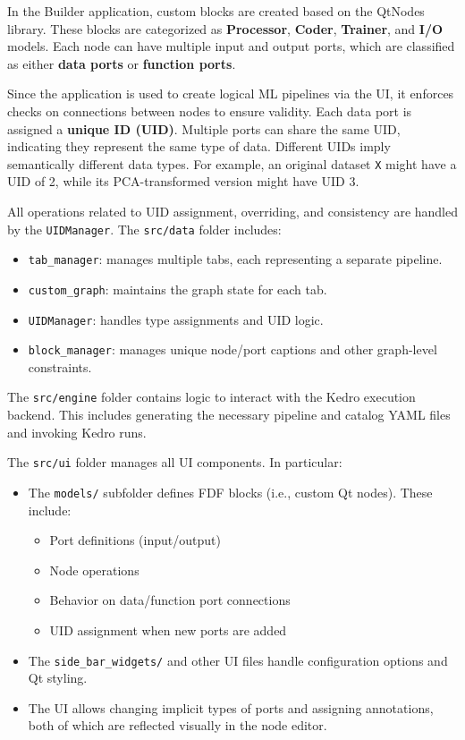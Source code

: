 In the Builder application, custom blocks are created based on the QtNodes library. These blocks are categorized as \textbf{Processor}, \textbf{Coder}, \textbf{Trainer}, and \textbf{I/O} models. Each node can have multiple input and output ports, which are classified as either \textbf{data ports} or \textbf{function ports}.

Since the application is used to create logical ML pipelines via the UI, it enforces checks on connections between nodes to ensure validity. Each data port is assigned a \textbf{unique ID (UID)}. Multiple ports can share the same UID, indicating they represent the same type of data. Different UIDs imply semantically different data types. For example, an original dataset \texttt{X} might have a UID of 2, while its PCA-transformed version might have UID 3.

All operations related to UID assignment, overriding, and consistency are handled by the \texttt{UIDManager}. The \texttt{src/data} folder includes:
\begin{itemize}
    \item \texttt{tab\_manager}: manages multiple tabs, each representing a separate pipeline.
    \item \texttt{custom\_graph}: maintains the graph state for each tab.
    \item \texttt{UIDManager}: handles type assignments and UID logic.
    \item \texttt{block\_manager}: manages unique node/port captions and other graph-level constraints.
\end{itemize}

The \texttt{src/engine} folder contains logic to interact with the Kedro execution backend. This includes generating the necessary pipeline and catalog YAML files and invoking Kedro runs.

The \texttt{src/ui} folder manages all UI components. In particular:
\begin{itemize}
    \item The \texttt{models/} subfolder defines FDF blocks (i.e., custom Qt nodes). These include:
    \begin{itemize}
        \item Port definitions (input/output)
        \item Node operations
        \item Behavior on data/function port connections
        \item UID assignment when new ports are added  
    \end{itemize}
    \item The \texttt{side\_bar\_widgets/} and other UI files handle configuration options and Qt styling.
    \item The UI allows changing implicit types of ports and assigning annotations, both of which are reflected visually in the node editor.
\end{itemize}

